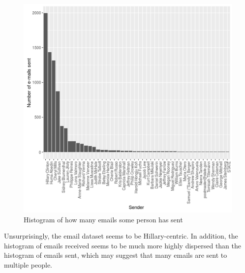 \begin{figure}[h]
  \centering
  \includegraphics[scale=0.8]{palmer/graphics/num_sent_histogram}
  \caption{Histogram of how many emails some person has sent}
  \label{fig:n_sent_hist}
\end{figure}

Unsurprisingly, the email dataset seems to be Hillary-centric.
In addition, the histogram of emails received seems to be much more highly dispersed than the histogram of emails sent, which may suggest that many emails are sent to multiple people.

